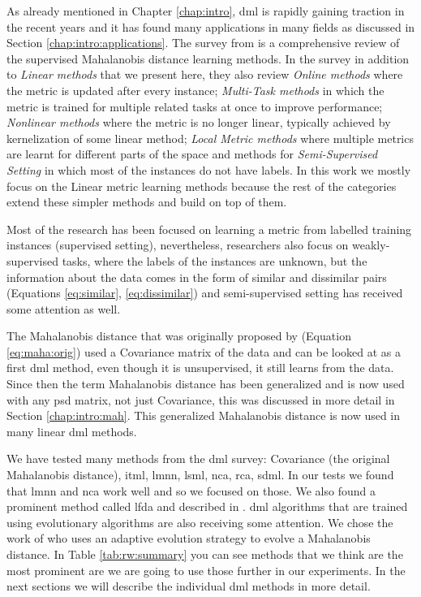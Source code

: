 \documentclass[12pt,a4paper]{report}
\begin{document}
As already mentioned in Chapter \ref{chap:intro}, \acl{dml} is rapidly gaining traction in the recent years and it has found many applications in many fields as discussed in Section \ref{chap:intro:applications}. The survey from \cite{bellet2013survey} is a comprehensive review of the supervised Mahalanobis distance learning methods. In the survey in addition to \textit{Linear methods} that we present here, they also review \textit{Online methods} where the metric is updated after every instance; \textit{Multi-Task methods} in which the metric is trained for multiple related tasks at once to improve performance; \textit{Nonlinear methods} where the metric is no longer linear, typically achieved by kernelization of some linear method; \textit{Local Metric methods} where multiple metrics are learnt for different parts of the space and methods for \textit{Semi-Supervised Setting} in which most of the instances do not have labels. In this work we mostly focus on the Linear metric learning methods because the rest of the categories extend these simpler methods and build on top of them.

Most of the research has been focused on learning a metric from labelled training instances (supervised setting), nevertheless, researchers also focus on weakly-supervised tasks, where the labels of the instances are unknown, but the information about the data comes in the form of similar and dissimilar pairs (Equations \ref{eq:similar}, \ref{eq:dissimilar}) and semi-supervised setting has received some attention as well.

The Mahalanobis distance that was originally proposed by \cite{mahalanobis1936generalized} (Equation \ref{eq:maha:orig}) used a Covariance matrix of the data and can be looked at as a first \acl{dml} method, even though it is unsupervised, it still learns from the data. Since then the term Mahalanobis distance has been generalized and is now used with any \ac{psd} matrix, not just Covariance, this was discussed in more detail in Section \ref{chap:intro:mah}. This generalized Mahalanobis distance is now used in many linear \acl{dml} methods.

We have tested many methods from the \ac{dml} survey: Covariance (the original Mahalanobis distance), \ac{itml}, \ac{lmnn}, \ac{lsml}, \ac{nca}, \ac{rca}, \ac{sdml}. In our tests we found that \ac{lmnn} and \ac{nca} work well and so we focused on those. We also found a prominent method called \ac{lfda} and described in \cite{sugiyama2007dimensionality}. \Acl{dml} algorithms that are trained using evolutionary algorithms are also receiving some attention. We chose the work of \cite{fukui2013evolutionary} who uses an adaptive evolution strategy to evolve a Mahalanobis distance. In Table \ref{tab:rw:summary} you can see methods that we think are the most prominent are we are going to use those further in our experiments. In the next sections we will describe the individual \acl{dml} methods in more detail.
\end{document}
